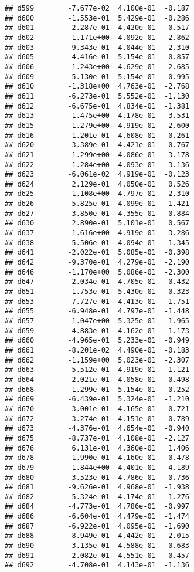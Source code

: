 \documentclass[
]{article}
\begin{document}
\begin{verbatim}
## d599        -7.677e-02  4.100e-01  -0.187
## d600        -1.553e-01  5.429e-01  -0.286
## d601         2.287e-01  4.420e-01   0.517
## d602        -1.171e+00  4.092e-01  -2.862
## d603        -9.343e-01  4.044e-01  -2.310
## d605        -4.416e-01  5.154e-01  -0.857
## d606        -1.243e+00  4.629e-01  -2.685
## d609        -5.130e-01  5.154e-01  -0.995
## d610        -1.318e+00  4.763e-01  -2.768
## d611        -6.273e-01  5.552e-01  -1.130
## d612        -6.675e-01  4.834e-01  -1.381
## d613        -1.475e+00  4.178e-01  -3.531
## d615        -1.279e+00  4.919e-01  -2.600
## d616        -1.201e-01  4.608e-01  -0.261
## d620        -3.389e-01  4.421e-01  -0.767
## d621        -1.299e+00  4.086e-01  -3.178
## d622        -1.284e+00  4.093e-01  -3.136
## d623        -6.061e-02  4.919e-01  -0.123
## d624         2.129e-01  4.050e-01   0.526
## d625        -1.108e+00  4.797e-01  -2.310
## d626        -5.825e-01  4.099e-01  -1.421
## d627        -3.850e-01  4.355e-01  -0.884
## d630         2.890e-01  5.101e-01   0.567
## d637        -1.616e+00  4.919e-01  -3.286
## d638        -5.506e-01  4.094e-01  -1.345
## d641        -2.022e-01  5.085e-01  -0.398
## d642        -9.370e-01  4.279e-01  -2.190
## d646        -1.170e+00  5.086e-01  -2.300
## d647         2.034e-01  4.705e-01   0.432
## d651        -1.753e-01  5.430e-01  -0.323
## d653        -7.727e-01  4.413e-01  -1.751
## d655        -6.948e-01  4.797e-01  -1.448
## d657        -1.047e+00  5.325e-01  -1.965
## d659        -4.883e-01  4.162e-01  -1.173
## d660        -4.965e-01  5.233e-01  -0.949
## d661        -8.201e-02  4.490e-01  -0.183
## d662        -1.159e+00  5.023e-01  -2.307
## d663        -5.512e-01  4.919e-01  -1.121
## d664        -2.021e-01  4.058e-01  -0.498
## d668         1.299e-01  5.154e-01   0.252
## d669        -6.439e-01  5.324e-01  -1.210
## d670        -3.001e-01  4.165e-01  -0.721
## d672        -3.274e-01  4.151e-01  -0.789
## d673        -4.376e-01  4.654e-01  -0.940
## d675        -8.737e-01  4.108e-01  -2.127
## d676         6.131e-01  4.360e-01   1.406
## d678        -1.990e-01  4.160e-01  -0.478
## d679        -1.844e+00  4.401e-01  -4.189
## d680        -3.523e-01  4.786e-01  -0.736
## d681        -9.626e-01  4.968e-01  -1.938
## d682        -5.324e-01  4.174e-01  -1.276
## d684        -4.773e-01  4.786e-01  -0.997
## d686        -6.604e-01  4.479e-01  -1.474
## d687        -6.922e-01  4.095e-01  -1.690
## d688        -8.949e-01  4.442e-01  -2.015
## d690        -3.135e-01  4.588e-01  -0.683
## d691         2.082e-01  4.551e-01   0.457
## d692        -4.708e-01  4.143e-01  -1.136

\end{verbatim}
\end{document}
